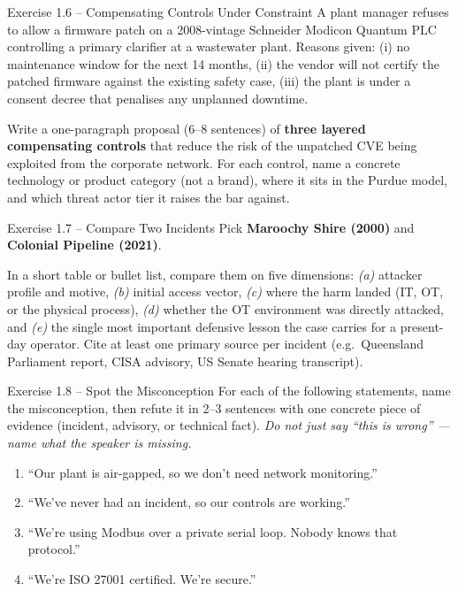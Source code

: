 \documentclass[11pt,a4paper]{article}
\begin{document}
\begin{taskbox}{Exercise 1.6 -- Compensating Controls Under Constraint}
A plant manager refuses to allow a firmware patch on a 2008-vintage Schneider Modicon Quantum PLC controlling a primary clarifier at a wastewater plant. Reasons given: (i) no maintenance window for the next 14 months, (ii) the vendor will not certify the patched firmware against the existing safety case, (iii) the plant is under a consent decree that penalises any unplanned downtime.

Write a one-paragraph proposal (6--8 sentences) of \textbf{three layered compensating controls} that reduce the risk of the unpatched CVE being exploited from the corporate network. For each control, name a concrete technology or product category (not a brand), where it sits in the Purdue model, and which threat actor tier it raises the bar against.
\end{taskbox}

\begin{taskbox}{Exercise 1.7 -- Compare Two Incidents}
Pick \textbf{Maroochy Shire (2000)} and \textbf{Colonial Pipeline (2021)}.

In a short table or bullet list, compare them on five dimensions: \emph{(a)} attacker profile and motive, \emph{(b)} initial access vector, \emph{(c)} where the harm landed (IT, OT, or the physical process), \emph{(d)} whether the OT environment was directly attacked, and \emph{(e)} the single most important defensive lesson the case carries for a present-day operator. Cite at least one primary source per incident (e.g.\ Queensland Parliament report, CISA advisory, US Senate hearing transcript).
\end{taskbox}

\begin{taskbox}{Exercise 1.8 -- Spot the Misconception}
For each of the following statements, name the misconception, then refute it in 2--3 sentences with one concrete piece of evidence (incident, advisory, or technical fact). \emph{Do not just say ``this is wrong'' --- name what the speaker is missing.}
\begin{enumerate}
  \item ``Our plant is air-gapped, so we don't need network monitoring.''
  \item ``We've never had an incident, so our controls are working.''
  \item ``We're using Modbus over a private serial loop. Nobody knows that protocol.''
  \item ``We're ISO 27001 certified. We're secure.''
\end{enumerate}
\end{taskbox}
\end{document}
